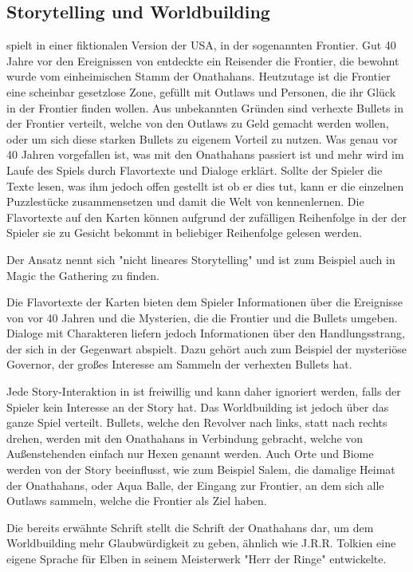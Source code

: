 \subsection{Storytelling und Worldbuilding}\label{subsec:storytellingUndWorldbuilding}

\FF spielt in einer fiktionalen Version der USA, in der sogenannten Frontier. Gut 40 Jahre vor den Ereignissen von \FF
entdeckte ein Reisender die Frontier, die bewohnt wurde vom einheimischen Stamm der Onathahans. Heutzutage ist die Frontier
eine scheinbar gesetzlose Zone, gefüllt mit Outlaws und Personen, die ihr Glück in der Frontier finden wollen.
Aus unbekannten Gründen sind verhexte Bullets in der Frontier verteilt, welche von den Outlaws zu Geld gemacht werden wollen,
oder um sich diese starken Bullets zu eigenem Vorteil zu nutzen. Was genau vor 40 Jahren vorgefallen ist, was mit den Onathahans
passiert ist und mehr wird im Laufe des Spiels durch Flavortexte und Dialoge erklärt. Sollte der Spieler die Texte lesen,
was ihm jedoch offen gestellt ist ob er dies tut, kann er die einzelnen Puzzlestücke zusammensetzen und damit die Welt von \FF kennenlernen.
Die Flavortexte auf den Karten können aufgrund der zufälligen Reihenfolge in der der Spieler sie zu Gesicht bekommt in beliebiger Reihenfolge gelesen werden.


Der Ansatz nennt sich "nicht lineares Storytelling" und ist zum Beispiel auch in Magic the Gathering zu finden.


Die Flavortexte der Karten bieten dem Spieler Informationen über die Ereignisse von vor 40 Jahren und die Mysterien,
die die Frontier und die Bullets umgeben. Dialoge mit Charakteren liefern jedoch Informationen über den Handlungsstrang,
der sich in der Gegenwart abspielt. Dazu gehört auch zum Beispiel der mysteriöse Governor, der großes Interesse am Sammeln der verhexten Bullets hat.


Jede Story-Interaktion in \FF ist freiwillig und kann daher ignoriert werden, falls der Spieler kein Interesse an der Story hat.
Das Worldbuilding ist jedoch über das ganze Spiel verteilt. Bullets, welche den Revolver nach links, statt nach rechts drehen,
werden mit den Onathahans in Verbindung gebracht, welche von Außenstehenden einfach nur Hexen genannt werden.
Auch Orte und Biome werden von der Story beeinflusst, wie zum Beispiel Salem, die damalige Heimat der Onathahans, oder Aqua Balle,
der Eingang zur Frontier, an dem sich alle Outlaws sammeln, welche die Frontier als Ziel haben.


Die bereits erwähnte Schrift stellt die Schrift der Onathahans dar, um dem Worldbuilding mehr Glaubwürdigkeit zu geben,
ähnlich wie J.R.R. Tolkien eine eigene Sprache für Elben in seinem Meisterwerk "Herr der Ringe" entwickelte. 

\renewcommand{\kapitelautor}{}
